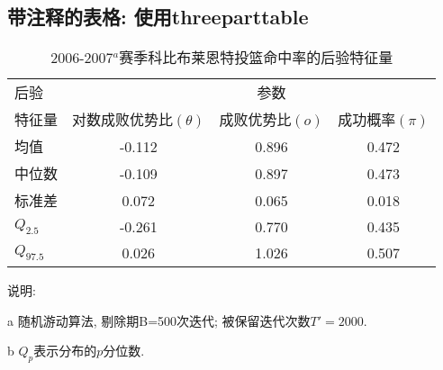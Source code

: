 \subsection{带注释的表格: 使用threeparttable}

\begin{table}[h]
  \caption{2006-2007$^a$\tnote{}赛季科比布莱恩特投篮命中率的后验特征量
  \label{table:tab8}}
  \centering\small
\begin{threeparttable}[b]
\begin{tabular}{lccc}
\toprule
后验 & & 参数 &\\
\cline{2-4}
特征量 & 对数成败优势比$(\theta)$ & 成败优势比$(o)$ & 成功概率$(\pi)$\\
\midrule
均值 & -0.112 & 0.896 & 0.472\\
中位数 & -0.109 & 0.897 & 0.473\\
标准差 & 0.072 & 0.065 & 0.018\\
$Q_{2.5}$\tnote{b} & -0.261 & 0.770 & 0.435\\
$Q_{97.5}$ & 0.026 & 1.026 & 0.507\\
\bottomrule
\end{tabular}
{\tiny 说明:
\begin{tablenotes}
\item[a] 随机游动算法, 剔除期B=500次迭代; 被保留迭代次数$T'=2000$.
\item[b] $Q_{p}$表示分布的$p$分位数.
\end{tablenotes}}
\end{threeparttable}
\end{table}


